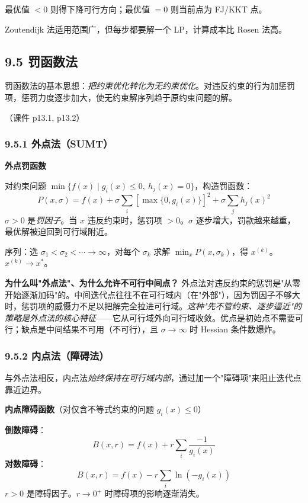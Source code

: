 最优值 $< 0$ 则得下降可行方向；最优值 $= 0$ 则当前点为 FJ/KKT 点。

Zoutendijk 法适用范围广，但每步都要解一个 LP，计算成本比 Rosen 法高。

\subsection{9.5 罚函数法}

罚函数法的基本思想：\emph{把约束优化转化为无约束优化}。对违反约束的行为加惩罚项，惩罚力度逐步加大，使无约束解序列趋于原约束问题的解。

（课件 p13.1, p13.2）

\subsubsection{9.5.1 外点法（SUMT）}

\textbf{外点罚函数}

对约束问题 $\min\{f(x) \mid g_i(x) \le 0,\ h_j(x)=0\}$，构造罚函数：
\[
P(x, \sigma) = f(x) + \sigma \sum_i [\max\{0, g_i(x)\}]^2
               + \sigma \sum_j h_j(x)^2
\]
$\sigma > 0$ 是\emph{罚因子}。当 $x$ 违反约束时，惩罚项 $>0$。$\sigma$ 逐步增大，罚款越来越重，最优解被迫回到可行域附近。

序列：选 $\sigma_1 < \sigma_2 < \cdots \to \infty$，对每个 $\sigma_k$ 求解 $\min_x P(x, \sigma_k)$，得 $x^{(k)}$。$x^{(k)} \to x^*$。

\textbf{为什么叫"外点法"、为什么允许不可行中间点？}
外点法对违反约束的惩罚是"从零开始逐渐加码"的。中间迭代点往往不在可行域内（在"外部"），因为罚因子不够大时，惩罚项的威慑力不足以把解完全拉进可行域。\emph{这种"先不管约束、逐步逼近"的策略是外点法的核心特征}——它从可行域外向可行域收敛。优点是初始点不需要可行；缺点是中间结果不可用（不可行），且 $\sigma \to \infty$ 时 Hessian 条件数爆炸。

\subsubsection{9.5.2 内点法（障碍法）}

与外点法相反，内点法\emph{始终保持在可行域内部}，通过加一个"障碍项"来阻止迭代点靠近边界。

\textbf{内点障碍函数}（对仅含不等式约束的问题 $g_i(x) \le 0$）

\textbf{倒数障碍}：
\[
B(x, r) = f(x) + r \sum_i \frac{-1}{g_i(x)}
\]
\textbf{对数障碍}：
\[
B(x, r) = f(x) - r \sum_i \ln(-g_i(x))
\]
$r > 0$ 是障碍因子。$r \to 0^+$ 时障碍项的影响逐渐消失。

